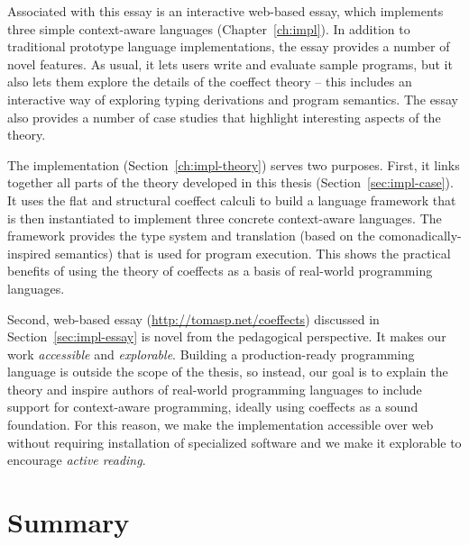 Associated with this essay is an interactive web-based essay, which implements three simple
context-aware languages (Chapter~\ref{ch:impl}). In addition to traditional prototype language
implementations, the essay provides a number of novel features. As usual, it lets users
write and evaluate sample programs, but it also lets them explore the details of the coeffect
theory -- this includes an interactive way of exploring typing derivations and program semantics.
The essay also provides a number of case studies that highlight interesting aspects of the theory.

The implementation (Section~\ref{ch:impl-theory}) serves two purposes. First, it links together all parts
of the theory developed in this thesis (Section~\ref{sec:impl-case}). It uses the flat and structural
coeffect calculi to build a language framework that is then instantiated to implement three concrete
context-aware languages. The  framework provides the type system and translation (based on the
comonadically-inspired semantics) that is used for program execution. This shows the practical
benefits of using the theory of coeffects as a basis of real-world programming languages.

Second, web-based essay (\url{http://tomasp.net/coeffects}) discussed in Section~\ref{sec:impl-essay}
is novel from the pedagogical perspective. It makes our work \emph{accessible} and \emph{explorable}.
Building a production-ready programming language is outside the scope of the  thesis, so instead,
our goal is to explain the theory and inspire authors of real-world programming languages to
include support for context-aware programming, ideally using coeffects as a sound foundation.
For this reason, we make the implementation accessible over web without requiring installation
of specialized software and we make it explorable to encourage \emph{active reading}.

%
%

\section{Summary}
\label{sec:conc-conclusions}

